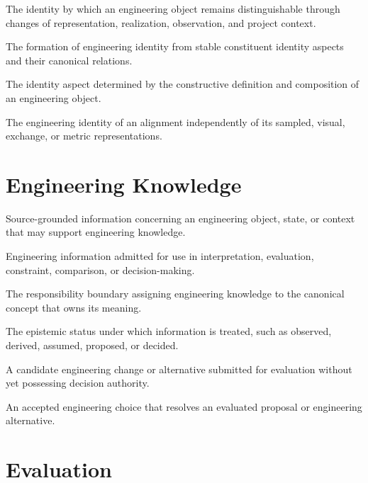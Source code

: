 {The identity by which an engineering object remains distinguishable
through changes of representation, realization, observation, and
project context.}

{The formation of engineering identity from stable constituent identity
aspects and their canonical relations.}

{The identity aspect determined by the constructive definition and
composition of an engineering object.}

{The engineering identity of an alignment independently of its sampled,
visual, exchange, or metric representations.}

\section*{Engineering Knowledge}

{Source-grounded information concerning an engineering object, state, or
context that may support engineering knowledge.}

{Engineering information admitted for use in interpretation, evaluation,
constraint, comparison, or decision-making.}

{The responsibility boundary assigning engineering knowledge to the
canonical concept that owns its meaning.}

{The epistemic status under which information is treated, such as
observed, derived, assumed, proposed, or decided.}

{A candidate engineering change or alternative submitted for evaluation
without yet possessing decision authority.}

{An accepted engineering choice that resolves an evaluated proposal or
engineering alternative.}

\section*{Evaluation}

